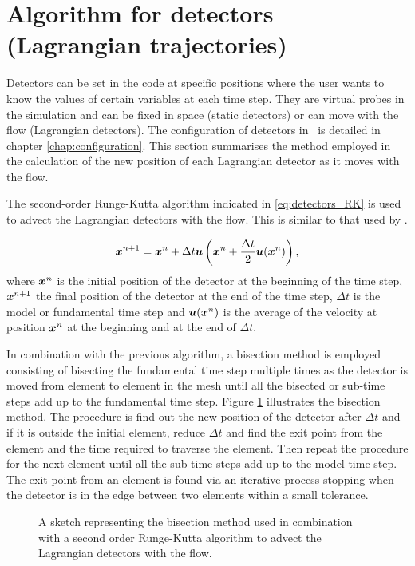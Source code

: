 \section{Algorithm for detectors (Lagrangian trajectories)}
  
Detectors can be set in the code at specific positions where the user wants
to know the values of certain variables at each time step. They are virtual
probes in the simulation and can be fixed in space (static detectors) or can
move with the flow (Lagrangian detectors). The configuration of detectors in
\fluidity\ is detailed in chapter
\ref{chap:configuration}. This section summarises the method
employed in the calculation of the new position of each Lagrangian detector
as it moves with the flow. 

The second-order Runge-Kutta algorithm indicated in \eqref{eq:detectors_RK}
is used to advect the Lagrangian detectors with the flow. This is similar to
that used by \cite{walters2007}.


\begin{equation}\label{eq:detectors_RK}
{\mbox{\boldmath$x$}}^{n+1} =  {\mbox{\boldmath$x$}}^{n} + \Delta t {\mbox{\boldmath$u$}}\left({\mbox{\boldmath$x$}}^{n} + \frac{\Delta t }{2} {\mbox{\boldmath$u$}}({\mbox{\boldmath$x$}}^{n})\right),
\end{equation}
where ${\mbox{\boldmath$x$}}^{n}$ is the initial position of the detector at the beginning of the time step, ${\mbox{\boldmath$x$}}^{n+1}$ the final position of the detector at the end of the time step, $\Delta t$ is the model or fundamental time step and ${\mbox{\boldmath$u$}}({\mbox{\boldmath$x$}}^{n})$ is the average of the velocity at position ${\mbox{\boldmath$x$}}^{n}$ at the beginning and at the end of $\Delta t$. 

In combination with the previous algorithm, a bisection method is employed consisting of bisecting the fundamental time step multiple times as the detector is moved from element to element in the mesh until all the bisected or sub-time steps add up to the fundamental time step. Figure \ref{fig:bisection_menthod} illustrates the bisection method. The procedure is find out the new position of the detector after $\Delta t$ and if it is outside the initial element, reduce $\Delta t$ and find the exit point from the element and the time required to traverse the element. Then repeat the procedure for the next element until all the sub time steps add up to the model time step. The exit point from an element is found via an iterative process stopping when the detector is in the edge between two elements within a small tolerance.
% 
\begin{figure}[ht]
  \centering
  \caption{A sketch representing the bisection method used in combination with a second order Runge-Kutta algorithm to advect the Lagrangian detectors with the flow.}
  \label{fig:bisection_menthod}
\end{figure}


